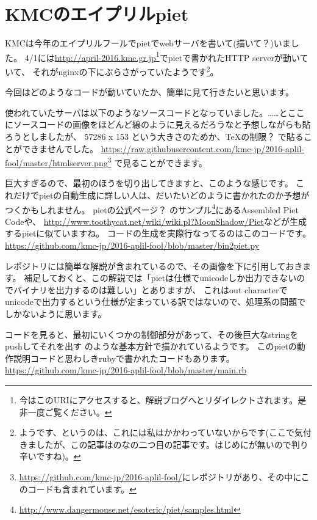 \chapter[KMCのエイプリルpiet]{KMCのエイプリルpiet}

KMCは今年のエイプリルフールでpietでwebサーバを書いて(描いて？)いました。
4/1には\url{http://april-2016.kmc.gr.jp}\footnote{今はこのURIにアクセスすると、解説ブログへとリダイレクトされます。是非一度ご覧ください。}でpietで書かれたHTTP serverが動いていて、
それがnginxの下にぶらさがっていたようです\footnote{ようです、というのは、これには私はかかわっていないからです(ここで気付きましたが、この記事はのなの二つ目の記事です。はじめにが無いので判り辛いですね)。}。

今回はどのようなコードが動いていたか、簡単に見て行きたいと思います。

使われていたサーバは以下のようなソースコードとなっていました。……とここにソースコードの画像をほどんど線のように見えるだろうなと予想しながらも貼ろうとしましたが、
57286 x 153 という大きさのためか、\TeX の制限？ で貼ることができませんでした。
\url{https://raw.githubusercontent.com/kmc-jp/2016-aplil-fool/master/htmlserver.png}\footnote{\url{https://github.com/kmc-jp/2016-aplil-fool/}にレポジトリがあり、その中にこのコードも含まれています。}
で見ることができます。

巨大すぎるので、最初のほうを切り出してきますと、このような感じです。
これだけでpietの自動生成に詳しい人は、だいたいどのように書かれたのか予想がつくかもしれません。
pietの公式ページ？ のサンプル\footnote{\url{http://www.dangermouse.net/esoteric/piet/samples.html}}にあるAssembled Piet Codeや、
\url{http://www.toothycat.net/wiki/wiki.pl?MoonShadow/Piet}などが生成するpietに似ていますね。
コードの生成を実際行なってるのはこのコードです。
\url{https://github.com/kmc-jp/2016-aplil-fool/blob/master/bin2piet.py}

レポジトリには簡単な解説が含まれているので、その画像を下に引用しておきます。
補足しておくと、この解説では「pietは仕様でunicodeしか出力できないのでバイナリを出力するのは難しい」とありますが、
これはout characterでunicodeで出力するという仕様が定まっている訳ではないので、処理系の問題でしかないように思います。

コードを見ると、最初にいくつかの制御部分があって、その後巨大なstringをpushしてそれを出す のような基本方針で描かれているようです。
このpietの動作説明コードと思わしきrubyで書かれたコードもあります。\url{https://github.com/kmc-jp/2016-aplil-fool/blob/master/main.rb}

